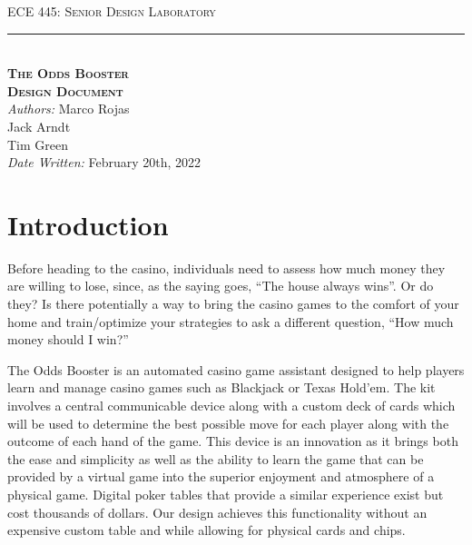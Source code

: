 \documentclass[12pt]{article}
\begin{document}
\begin{titlepage}
\begin{center}
{\LARGE \textsc{ECE 445: Senior Design Laboratory} \\ \vspace{8pt}}
\rule[13pt]{\textwidth}{1pt} \\ \vspace{120pt}
{\huge \textbf{\textsc{The Odds Booster}} \\ \vspace{8pt}}
{\LARGE \textbf{\textsc{Design Document}} \\ \vspace{30pt}} 
{\large \textit{Authors:} Marco Rojas \\ \vspace{4pt}
\hspace{48pt} Jack Arndt \\ \vspace{4pt}
\hspace{48pt} Tim Green \\ \vspace{4pt}
\hspace{8pt} \textit{Date Written:} February 20th, 2022}
\vfill
\end{center}

\end{titlepage}
\setcounter{page}{2}

\tableofcontents
\newpage

\listoffigures
\listoftables
\newpage

\section{Introduction}

Before heading to the casino, individuals need to assess how much money they are willing to lose, since, as the saying goes, ``The house always wins''. Or do they? Is there potentially a way to bring the casino games to the comfort of your home and train/optimize your strategies to ask a different question, ``How much money should I win?''

The Odds Booster is an automated casino game assistant designed to help players learn and manage casino games such as Blackjack or Texas Hold'em. The kit involves a central communicable device along with a custom deck of cards which will be used to determine the best possible move for each player along with the outcome of each hand of the game. This device is an innovation as it brings both the ease and simplicity as well as the ability to learn the game that can be provided by a virtual game into the superior enjoyment and atmosphere of a physical game. Digital poker tables that provide a similar experience exist but cost thousands of dollars. Our design achieves this functionality without an expensive custom table and while allowing for physical cards and chips.
\end{document}
